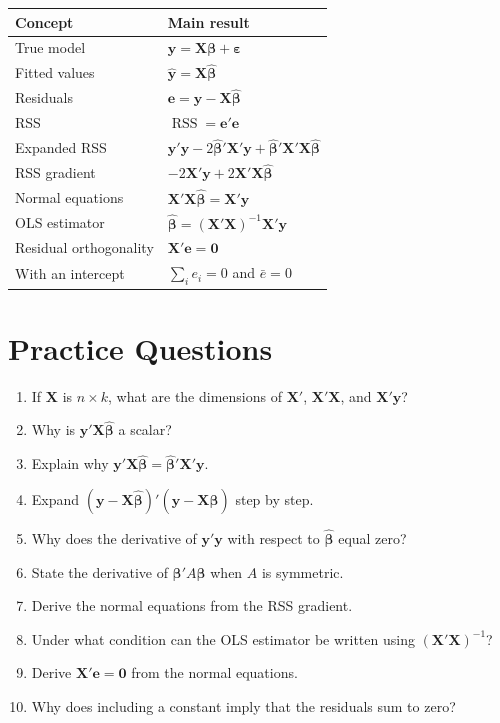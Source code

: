 \documentclass[11pt,a4paper]{article}
\numberwithin{equation}{section}
\newcommand{\bhat}{\hat{\boldsymbol{\beta}}}
\newcommand{\eps}{\boldsymbol{\varepsilon}}
\newcommand{\ee}{\mathbf{e}}
\newcommand{\XX}{\mathbf{X}}
\newcommand{\yy}{\mathbf{y}}
\newcommand{\RSS}{\operatorname{RSS}}
\begin{document}
\begin{center}
\begin{tabular}{p{}p{}}
\toprule
\textbf{Concept} & \textbf{Main result}\\
\midrule
True model & $\yy=\XX\boldsymbol{\beta}+\eps$\\
Fitted values & $\widehat{\yy}=\XX\bhat$\\
Residuals & $\ee=\yy-\XX\bhat$\\
RSS & $\RSS=\ee'\ee$\\
Expanded RSS & $\yy'\yy-2\bhat'\XX'\yy+\bhat'\XX'\XX\bhat$\\
RSS gradient & $-2\XX'\yy+2\XX'\XX\bhat$\\
Normal equations & $\XX'\XX\bhat=\XX'\yy$\\
OLS estimator & $\bhat=(\XX'\XX)^{-1}\XX'\yy$\\
Residual orthogonality & $\XX'\ee=\mathbf{0}$\\
With an intercept & $\sum_i e_i=0$ and $\bar e=0$\\
\bottomrule
\end{tabular}
\end{center}

\section{Practice Questions}

\begin{enumerate}
    \item If $\XX$ is $n\times k$, what are the dimensions of $\XX'$, $\XX'\XX$, and $\XX'\yy$?
    \item Why is $\yy'\XX\bhat$ a scalar?
    \item Explain why $\yy'\XX\bhat=\bhat'\XX'\yy$.
    \item Expand $(\yy-\XX\bhat)'(\yy-\XX\bhat)$ step by step.
    \item Why does the derivative of $\yy'\yy$ with respect to $\bhat$ equal zero?
    \item State the derivative of $\boldsymbol{\beta}'A\boldsymbol{\beta}$ when $A$ is symmetric.
    \item Derive the normal equations from the RSS gradient.
    \item Under what condition can the OLS estimator be written using $(\XX'\XX)^{-1}$?
    \item Derive $\XX'\ee=\mathbf{0}$ from the normal equations.
    \item Why does including a constant imply that the residuals sum to zero?
\end{enumerate}
\end{document}
